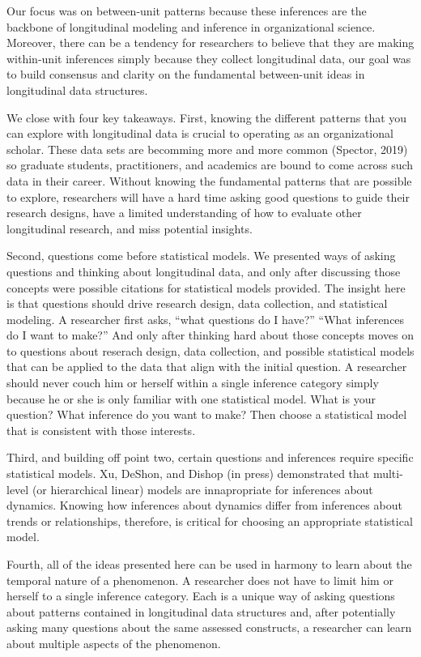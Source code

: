 \documentclass[english,,man]{apa6}
\theoremstyle{definition}
\theoremstyle{definition}
\theoremstyle{definition}
\theoremstyle{remark}
\begin{document}
Our focus was on between-unit patterns because these inferences are the
backbone of longitudinal modeling and inference in organizational
science. Moreover, there can be a tendency for researchers to believe
that they are making within-unit inferences simply because they collect
longitudinal data, our goal was to build consensus and clarity on the
fundamental between-unit ideas in longitudinal data structures.

We close with four key takeaways. First, knowing the different patterns
that you can explore with longitudinal data is crucial to operating as
an organizational scholar. These data sets are becomming more and more
common (Spector, 2019) so graduate students, practitioners, and
academics are bound to come across such data in their career. Without
knowing the fundamental patterns that are possible to explore,
researchers will have a hard time asking good questions to guide their
research designs, have a limited understanding of how to evaluate other
longitudinal research, and miss potential insights.

Second, questions come before statistical models. We presented ways of
asking questions and thinking about longitudinal data, and only after
discussing those concepts were possible citations for statistical models
provided. The insight here is that questions should drive research
design, data collection, and statistical modeling. A researcher first
asks, \enquote{what questions do I have?} \enquote{What inferences do I
want to make?} And only after thinking hard about those concepts moves
on to questions about reserach design, data collection, and possible
statistical models that can be applied to the data that align with the
initial question. A researcher should never couch him or herself within
a single inference category simply because he or she is only familiar
with one statistical model. What is your question? What inference do you
want to make? Then choose a statistical model that is consistent with
those interests.

Third, and building off point two, certain questions and inferences
require specific statistical models. Xu, DeShon, and Dishop (in press)
demonstrated that multi-level (or hierarchical linear) models are
innapropriate for inferences about dynamics. Knowing how inferences
about dynamics differ from inferences about trends or relationships,
therefore, is critical for choosing an appropriate statistical model.

Fourth, all of the ideas presented here can be used in harmony to learn
about the temporal nature of a phenomenon. A researcher does not have to
limit him or herself to a single inference category. Each is a unique
way of asking questions about patterns contained in longitudinal data
structures and, after potentially asking many questions about the same
assessed constructs, a researcher can learn about multiple aspects of
the phenomenon.
\end{document}
